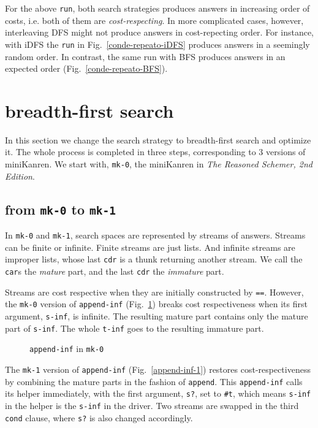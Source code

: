 \documentclass[format=acmlarge, review=true, authordraft=true]{acmart}
\begin{document}

For the above \texttt{run}, both search strategies produces answers in increasing
order of costs, i.e. both of them are \emph{cost-respecting}. In more complicated
cases, however, interleaving DFS might not produce answers in cost-repecting order.
For instance, with iDFS the \texttt{run} in Fig.~\ref{conde-repeato-iDFS} produces
answers in a seemingly random order. In contrast, the same run with BFS produces
answers in an expected order (Fig.~\ref{conde-repeato-BFS}).



\section{breadth-first search}

In this section we change the search strategy to breadth-first search and optimize it. The whole process is completed in three steps, corresponding to 3 versions of miniKanren. We start with, \texttt{mk-0}, the miniKanren in \emph{The Reasoned Schemer, 2nd Edition}.

\subsection{from \texttt{mk-0} to \texttt{mk-1}}

In \texttt{mk-0} and \texttt{mk-1}, search spaces are represented by streams of answers. Streams can be finite or infinite. Finite streams are just lists. And infinite streams are improper lists, whose last \texttt{cdr} is a thunk returning another stream. We call the \texttt{car}s the \emph{mature} part, and the last \texttt{cdr} the \emph{immature} part. 

Streams are cost respective when they are initially constructed by \texttt{==}. However, the \texttt{mk-0} version of \texttt{append-inf} (Fig.~\ref{append-inf-0}) breaks cost respectiveness when its first argument, \texttt{s-inf}, is infinite. The resulting mature part contains only the mature part of \texttt{s-inf}. The whole \texttt{t-inf} goes to the resulting immature part.

\begin{figure}
	 	
	 \caption{\texttt{append-inf} in \texttt{mk-0}}
	 \label{append-inf-0}
\end{figure}

The \texttt{mk-1} version of \texttt{append-inf} (Fig.~\ref{append-inf-1}) restores cost-respectiveness by combining the mature parts in the fashion of \texttt{append}. This \texttt{append-inf} calls its helper immediately, with the first argument, \texttt{s?}, set to \texttt{\#{}t}, which means \texttt{s-inf} in the helper is the \texttt{s-inf} in the driver. Two streams are swapped in the third \texttt{cond} clause, where \texttt{s?} is also changed accordingly.
\end{document}
